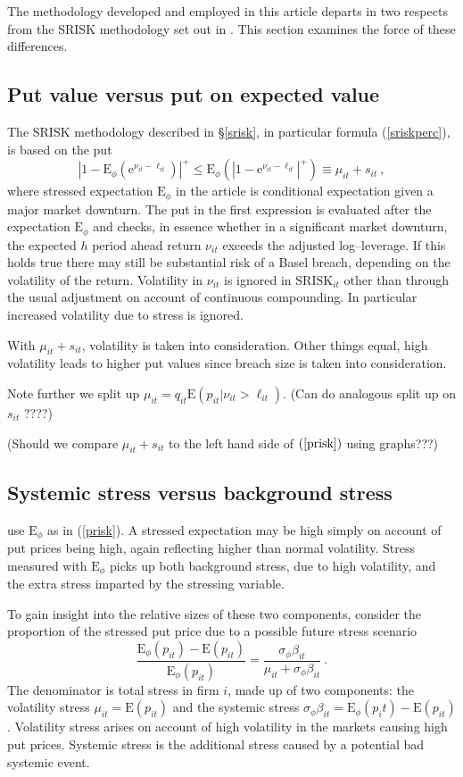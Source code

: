 \documentclass[authoryear]{elsarticle}
\newcommand{\E}{\mathrm{E}}
\newcommand{\e}{\mathrm{e}}
\newcommand{\Es}{\E_\phi}
\newcommand{\eref}[1]{(\ref{#1})}
\newcommand{\sref}[1]{\S\ref{#1}}
\newcommand{\be}[1]{\begin{equation}\label{#1}}
\newcommand{\ee}{\end{equation}}
\begin{document}
The methodology developed and employed in this article departs in two respects from the SRISK methodology set out in \cite{brownlees2015}.  This section examines the force of these differences.

\subsection{Put value versus put on expected value} 

The SRISK methodology described in \sref{srisk}, in particular formula \eref{sriskperc}, is based on the put
\be{prisk}
 |1-\E_\phi(\e^{\nu_{it}-\ell_{it}})|^+\le \Es(|1-\e^{\nu_{it}-\ell_{it}}|^+) \equiv \mu_{it}+s_{it}\ , 
\ee
where stressed expectation $\Es$ in the \cite{brownlees2015} article is conditional expectation given a major market downturn.  The   put in the first expression is evaluated after the expectation $\Es$ and checks, in essence whether in a significant market downturn, the expected $h$ period ahead return $\nu_{it}$ exceeds the adjusted   log--leverage.  If this holds true there may still be substantial risk of a Basel breach, depending on the volatility of the return.   Volatility in $\nu_{it}$ is ignored in  $\mathrm{SRISK}_{it}$  other than through the usual adjustment on account of continuous compounding.  In particular increased volatility due to stress is ignored.

With $\mu_{it}+s_{it}$, volatility is taken into consideration.  Other things equal, high volatility leads to higher put values since breach size  is taken into consideration.  

Note further we split up $\mu_{it}=q_{it}\E(p_{it}|\nu_{it}>\ell_{it})$.    (Can do analogous split up on $s_{it}$ ????) 

(Should we compare $\mu_{it}+s_{it}$ to the left  hand side of $\eref{prisk}$ using graphs???) 

\subsection{Systemic stress versus background stress}

\cite{brownlees2015} use $\Es$ as in \eref{prisk}.  A stressed expectation may be high simply on account of put prices being high, again reflecting higher than normal volatility.
Stress measured with $\Es$  picks up both background stress, due to high volatility, and the extra stress imparted by the stressing variable.

To gain insight into the relative sizes of these two components, consider the proportion of the stressed put price due to a possible future stress scenario
$$
\frac{\Es(p_{it})-\E(p_{it})}{\Es(p_{it})} = \frac{\sigma_\phi\beta_{it}}{\mu_{it}+\sigma_\phi\beta_{it}}  \ . 
$$
The denominator is total stress in firm $i$, made up of two components:   the volatility stress $\mu_{it}=\E(p_{it})$ and the systemic stress $\sigma_\phi\beta_{it}=\Es(p_it)-\E(p_{it})$.   Volatility stress  arises on account  of high volatility in the markets causing high put prices.   Systemic stress is the additional stress caused by  a potential  bad systemic event.     
\end{document}
